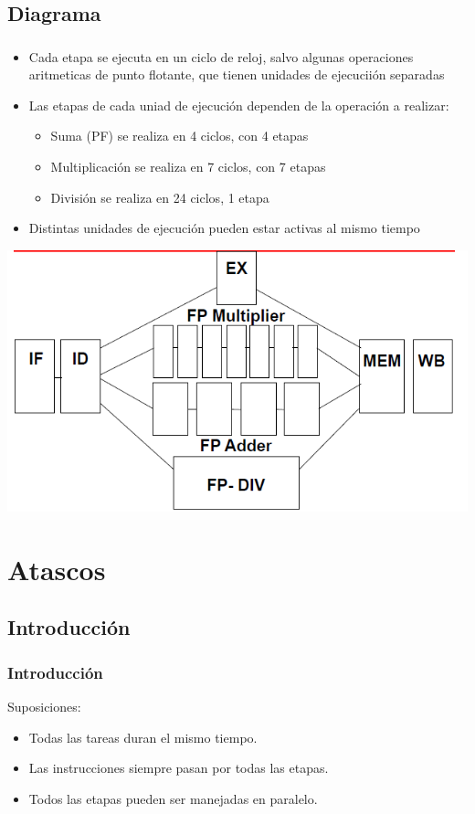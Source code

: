 \documentclass{beamer}
\begin{document}
\subsection{Diagrama}
\begin{frame}
\frametitle{}
\begin{itemize}
\item Cada etapa se ejecuta en un ciclo de reloj, salvo algunas operaciones aritmeticas de punto flotante, que tienen unidades de ejecuciión separadas
\item Las etapas de cada uniad de ejecución dependen de la operación a realizar:
\begin{itemize}
\item Suma (PF) se realiza en 4 ciclos, con 4 etapas
\item Multiplicación se realiza en 7 ciclos, con 7 etapas
\item División se realiza en 24 ciclos, 1 etapa
\end{itemize}
\item Distintas unidades de ejecución pueden estar activas al mismo tiempo
\end{itemize}
\includegraphics[scale=0.35]{ciclo-instruccion.png}
\end{frame}

\section{Atascos}

\subsection{Introducción}
\begin{frame}
\frametitle{Introducción}
Suposiciones:
\begin{itemize}
\item Todas las tareas duran el mismo tiempo.
\item Las instrucciones siempre pasan por todas las etapas.
\item Todos las etapas pueden ser manejadas en paralelo.
\end{itemize}
\end{frame}
\end{document}

